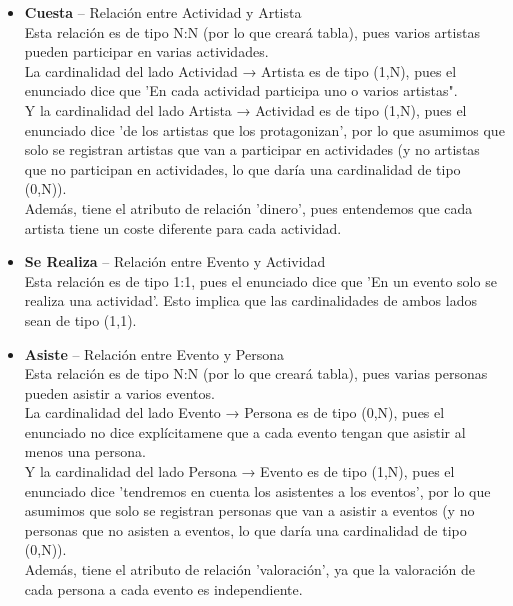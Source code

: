 \documentclass[12pt]{article}
\begin{document}
    \begin{itemize}
        \item \textbf{Cuesta} -- Relación entre Actividad y Artista\\
            Esta relación es de tipo N:N (por lo que creará tabla), pues varios artistas pueden participar en varias actividades. \\
            La cardinalidad del lado Actividad → Artista es de tipo (1,N), pues el enunciado dice que 'En cada actividad participa uno o varios artistas". \\
            Y la cardinalidad del lado Artista → Actividad es de tipo (1,N), pues el enunciado dice 'de los artistas que los protagonizan', por lo que asumimos
            que solo se registran artistas que van a participar en actividades (y no artistas que no participan en actividades, lo que daría una cardinalidad
            de tipo (0,N)). \\
            Además, tiene el atributo de relación 'dinero', pues entendemos que cada artista tiene un coste diferente para cada actividad.
        
        \item \textbf{Se Realiza} -- Relación entre Evento y Actividad\\
            Esta relación es de tipo 1:1, pues el enunciado dice que 'En un evento solo se realiza una actividad'. Esto implica que las cardinalidades
            de ambos lados sean de tipo (1,1).

        \item \textbf{Asiste} -- Relación entre Evento y Persona\\
            Esta relación es de tipo N:N (por lo que creará tabla), pues varias personas pueden asistir a varios eventos. \\
            La cardinalidad del lado Evento → Persona es de tipo (0,N), pues el enunciado no dice explícitamene que a cada evento tengan que asistir al menos
            una persona. \\
            Y la cardinalidad del lado Persona → Evento es de tipo (1,N), pues el enunciado dice 'tendremos en cuenta los asistentes a los eventos', 
            por lo que asumimos que solo se registran personas que van a asistir a eventos (y no personas que no asisten a eventos, lo que daría una cardinalidad
            de tipo (0,N)). \\
            Además, tiene el atributo de relación 'valoración', ya que la valoración de cada persona a cada evento es independiente.
                

\end{itemize}
\end{document}
